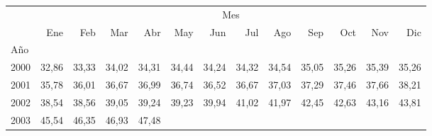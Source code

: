 \begin{tabular}{lllllllllllll}
\cline{1-13}
\multicolumn{1}{c}{} &
  \multicolumn{12}{|c}{Mes} \\
\multicolumn{1}{c}{} &
  \multicolumn{1}{|r}{Ene} &
  \multicolumn{1}{r}{Feb} &
  \multicolumn{1}{r}{Mar} &
  \multicolumn{1}{r}{Abr} &
  \multicolumn{1}{r}{May} &
  \multicolumn{1}{r}{Jun} &
  \multicolumn{1}{r}{Jul} &
  \multicolumn{1}{r}{Ago} &
  \multicolumn{1}{r}{Sep} &
  \multicolumn{1}{r}{Oct} &
  \multicolumn{1}{r}{Nov} &
  \multicolumn{1}{r}{Dic} \\
\cline{1-13}
\multicolumn{1}{l}{Año} &
  \multicolumn{1}{|r}{} &
  \multicolumn{1}{r}{} &
  \multicolumn{1}{r}{} &
  \multicolumn{1}{r}{} &
  \multicolumn{1}{r}{} &
  \multicolumn{1}{r}{} &
  \multicolumn{1}{r}{} &
  \multicolumn{1}{r}{} &
  \multicolumn{1}{r}{} &
  \multicolumn{1}{r}{} &
  \multicolumn{1}{r}{} &
  \multicolumn{1}{r}{} \\
\multicolumn{1}{l}{\hspace{1em}2000} &
  \multicolumn{1}{|r}{32,86} &
  \multicolumn{1}{r}{33,33} &
  \multicolumn{1}{r}{34,02} &
  \multicolumn{1}{r}{34,31} &
  \multicolumn{1}{r}{34,44} &
  \multicolumn{1}{r}{34,24} &
  \multicolumn{1}{r}{34,32} &
  \multicolumn{1}{r}{34,54} &
  \multicolumn{1}{r}{35,05} &
  \multicolumn{1}{r}{35,26} &
  \multicolumn{1}{r}{35,39} &
  \multicolumn{1}{r}{35,26} \\
\multicolumn{1}{l}{\hspace{1em}2001} &
  \multicolumn{1}{|r}{35,78} &
  \multicolumn{1}{r}{36,01} &
  \multicolumn{1}{r}{36,67} &
  \multicolumn{1}{r}{36,99} &
  \multicolumn{1}{r}{36,74} &
  \multicolumn{1}{r}{36,52} &
  \multicolumn{1}{r}{36,67} &
  \multicolumn{1}{r}{37,03} &
  \multicolumn{1}{r}{37,29} &
  \multicolumn{1}{r}{37,46} &
  \multicolumn{1}{r}{37,66} &
  \multicolumn{1}{r}{38,21} \\
\multicolumn{1}{l}{\hspace{1em}2002} &
  \multicolumn{1}{|r}{38,54} &
  \multicolumn{1}{r}{38,56} &
  \multicolumn{1}{r}{39,05} &
  \multicolumn{1}{r}{39,24} &
  \multicolumn{1}{r}{39,23} &
  \multicolumn{1}{r}{39,94} &
  \multicolumn{1}{r}{41,02} &
  \multicolumn{1}{r}{41,97} &
  \multicolumn{1}{r}{42,45} &
  \multicolumn{1}{r}{42,63} &
  \multicolumn{1}{r}{43,16} &
  \multicolumn{1}{r}{43,81} \\
\multicolumn{1}{l}{\hspace{1em}2003} &
  \multicolumn{1}{|r}{45,54} &
  \multicolumn{1}{r}{46,35} &
  \multicolumn{1}{r}{46,93} &
  \multicolumn{1}{r}{47,48} &

\end{tabular}
